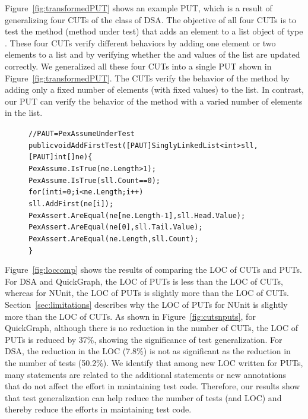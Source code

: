 Figure~\ref{fig:transformedPUT} shows an example PUT, which is a result of generalizing four CUTs of the  class of DSA. The objective of all four CUTs is to test the  method (method under test) that adds an element to a list object of type . These four CUTs verify different behaviors by adding one element or two elements to a list and by verifying whether the  and  values of the list are updated correctly. We generalized all these four CUTs into a single PUT shown in Figure~\ref{fig:transformedPUT}. The CUTs verify the behavior of the  method by adding only a fixed number of elements (with fixed values) to the list. In contrast, our PUT can verify the behavior of the  method with a varied number of elements in the list. 

\begin{figure}[t]
\begin{CodeOut}
\begin{alltt}
//PAUT = PexAssumeUnderTest
public void AddFirstTest([PAUT]SinglyLinkedList<int> sll, 
\hspace*{0.6in}[PAUT]int[] ne) \{            
\hspace*{0.2in}PexAssume.IsTrue(ne.Length > 1);
\hspace*{0.2in}PexAssume.IsTrue(sll.Count == 0);
\hspace*{0.2in}for (int i = 0; i < ne.Length; i++)
\hspace*{0.4in}sll.AddFirst(ne[i]);
\hspace*{0.2in}PexAssert.AreEqual(ne[ne.Length - 1], sll.Head.Value);            
\hspace*{0.2in}PexAssert.AreEqual(ne[0], sll.Tail.Value);
\hspace*{0.2in}PexAssert.AreEqual(ne.Length, sll.Count);
\}
\end{alltt}
\end{CodeOut}\vspace*{-4ex}
 \vspace*{-3ex}
\end{figure}

Figure~\ref{fig:loccomp} shows the results of comparing the LOC of CUTs and PUTs. For DSA and QuickGraph, the LOC of PUTs is less than the LOC of CUTs, whereas for NUnit, the LOC of PUTs is slightly more than the LOC of CUTs. Section~\ref{sec:limitations} describes why the LOC of PUTs for NUnit is slightly more than the LOC of CUTs. As shown in Figure~\ref{fig:cutsnputs}, for QuickGraph, although there is no reduction in the number of CUTs, the LOC of PUTs is reduced by 37\%, showing the significance of test generalization. For DSA, the reduction in the LOC (7.8\%) is not as significant as the reduction in the number of tests (50.2\%). We identify that among new LOC written for PUTs, many statements are related to the additional  statements or new annotations that do not affect the effort in maintaining test code. Therefore, our results show that test generalization can help reduce the number of tests (and LOC) and thereby reduce the efforts in maintaining test code.

